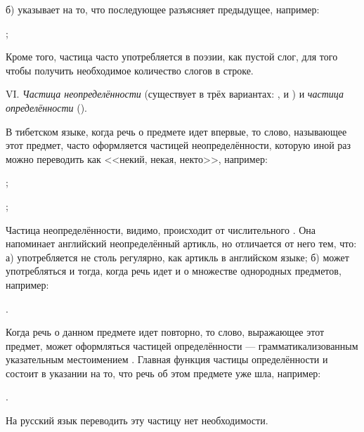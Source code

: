б) указывает на то, что последующее разъясняет предыдущее, например:
\begin{prfsample}
	\item {};
\end{prfsample}

Кроме того, частица  часто употребляется в поэзии, как пустой слог, для того чтобы получить необходимое количество слогов в строке.

VI.	\emph{Частица неопределённости} (существует в трёх вариантах: ,  и ) и \emph{частица определённости} ().

В тибетском языке, когда речь о предмете идет впервые, то слово, называющее этот предмет, часто оформляется частицей неопределённости, которую иной раз можно переводить как <<некий, некая, некто>>, например:
\begin{prfsample}
	\item {};
	\item {};
\end{prfsample}

Частица неопределённости, видимо, происходит от числительного . Она напоминает английский неопределённый артикль, но отличается от него тем, что: а) употребляется не столь регулярно, как артикль в английском языке; б) может употребляться и тогда, когда речь идет и о множестве однородных предметов, например:
\begin{prfsample}
	\item {}.
\end{prfsample}

Когда речь о данном предмете идет повторно, то слово, выражающее этот предмет, может оформляться частицей определённости  --- грамматикализованным указательным местоимением . Главная функция частицы определённости и состоит в указании на то, что речь об этом предмете уже шла, например:
\begin{prfsample}
	\item {}.
\end{prfsample}
На русский язык переводить эту частицу нет необходимости.


